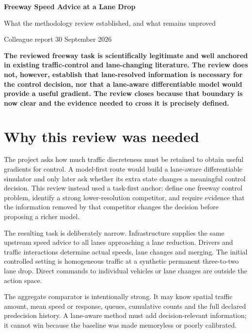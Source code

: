 \documentclass[10pt]{article}
\newcommand{\finding}[1]{%
  \begin{center}\colorbox{pale}{\parbox{0.93\linewidth}{\textbf{#1}}}\end{center}}
\begin{document}
\begin{center}
{\LARGE\bfseries\color{navy} Freeway Speed Advice at a Lane Drop}\par
\vspace{2mm}
{\large What the methodology review established, and what remains unproved}\par
\vspace{2mm}
{\small Colleague report \textbar{} 30 September 2026}
\end{center}

\finding{The reviewed freeway task is scientifically legitimate and well anchored in
existing traffic-control and lane-changing literature. The review does not,
however, establish that lane-resolved information is necessary for the control
decision, nor that a lane-aware differentiable model would provide a useful
gradient. The review closes because that boundary is now clear and the evidence
needed to cross it is precisely defined.}

\section{Why this review was needed}

The project asks how much traffic discreteness must be retained to obtain useful
gradients for control. A model-first route would build a lane-aware differentiable
simulator and only later ask whether its extra state changes a meaningful control
decision. This review instead used a task-first anchor: define one freeway control
problem, identify a strong lower-resolution competitor, and require evidence that
the information removed by that competitor changes the decision before proposing
a richer model.

The resulting task is deliberately narrow. Infrastructure supplies the same
upstream speed advice to all lanes approaching a lane reduction. Drivers and
traffic interactions determine actual speeds, lane changes and merging. The
initial controlled setting is homogeneous traffic at a synthetic permanent
three-to-two lane drop. Direct commands to individual vehicles or lane changes
are outside the action space.

The aggregate comparator is intentionally strong. It may know spatial traffic
amount, mean speed or response, queues, cumulative counts and the full declared
predecision history. A lane-aware method must add decision-relevant information;
it cannot win because the baseline was made memoryless or poorly calibrated.
\end{document}
